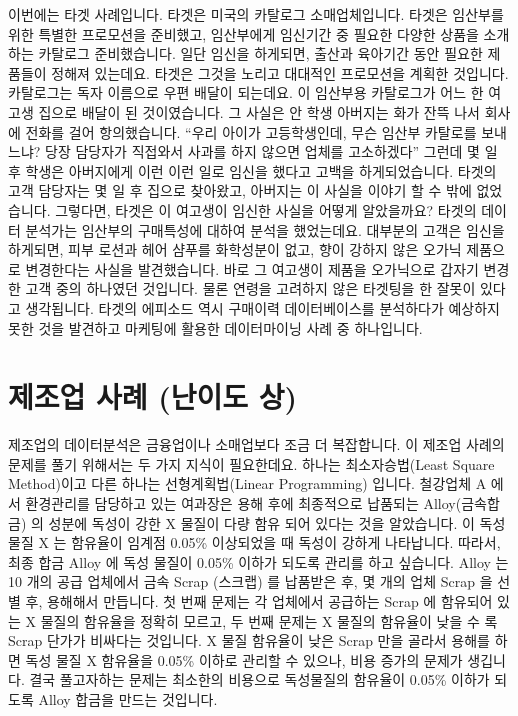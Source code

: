 \documentclass[letterpaper,10pt,english]{jupyterBook}
\begin{document}
\sphinxAtStartPar
이번에는 타겟 사례입니다. 타겟은 미국의 카탈로그 소매업체입니다. 타겟은 임산부를 위한 특별한 프로모션을 준비했고, 임산부에게 임신기간 중 필요한 다양한 상품을 소개하는 카탈로그 준비했습니다. 일단 임신을 하게되면, 출산과 육아기간 동안 필요한 제품들이 정해져 있는데요. 타겟은 그것을 노리고 대대적인 프로모션을 계획한 것입니다. 카탈로그는 독자 이름으로 우편 배달이 되는데요. 이 임산부용 카탈로그가 어느 한 여고생 집으로 배달이 된 것이였습니다. 그 사실은 안 학생 아버지는 화가 잔뜩 나서 회사에 전화를 걸어 항의했습니다. “우리 아이가 고등학생인데, 무슨 임산부 카탈로를 보내느냐? 당장 담당자가 직접와서 사과를 하지 않으면 업체를 고소하겠다”  그런데 몇 일 후 학생은 아버지에게 이런 이런 일로 임신을 했다고 고백을 하게되었습니다. 타겟의 고객 담당자는 몇 일 후 집으로 찾아왔고, 아버지는 이 사실을 이야기 할 수 밖에 없었습니다. 그렇다면, 타겟은 이 여고생이 임신한 사실을 어떻게 알았을까요?  타겟의 데이터 분석가는 임산부의 구매특성에 대하여 분석을 했었는데요. 대부분의 고객은 임신을 하게되면, 피부 로션과 헤어 샴푸를 화학성분이 없고, 향이 강하지 않은 오가닉 제품으로 변경한다는 사실을 발견했습니다. 바로 그 여고생이 제품을 오가닉으로 갑자기 변경한 고객 중의 하나였던 것입니다. 물론 연령을 고려하지 않은 타겟팅을 한 잘못이 있다고 생각됩니다. 타겟의 에피소드 역시 구매이력 데이터베이스를 분석하다가 예상하지 못한 것을 발견하고 마케팅에 활용한 데이터마이닝 사례 중 하나입니다.


\section{제조업 사례 (난이도 상)}
\label{\detokenize{chapter3/3.1.4_Use_Case:id1}}\label{\detokenize{chapter3/3.1.4_Use_Case::doc}}
\sphinxAtStartPar
제조업의 데이터분석은 금융업이나 소매업보다 조금 더 복잡합니다.  이 제조업 사례의 문제를 풀기 위해서는 두 가지 지식이 필요한데요. 하나는 최소자승법(Least Square Method)이고 다른 하나는 선형계획법(Linear Programming) 입니다.  철강업체 A 에서 환경관리를 담당하고 있는 여과장은 용해 후에 최종적으로 납품되는 Alloy(금속합금) 의 성분에 독성이 강한 X 물질이 다량 함유 되어 있다는 것을 알았습니다. 이 독성물질 X 는 함유율이 임계점 0.05\% 이상되었을 때 독성이 강하게 나타납니다. 따라서, 최종 합금 Alloy 에 독성 물질이 0.05\% 이하가 되도록 관리를 하고 싶습니다. Alloy 는 10 개의 공급 업체에서 금속 Scrap (스크랩) 를 납품받은 후, 몇 개의 업체 Scrap 을 선별 후, 용해해서 만듭니다. 첫 번째 문제는 각 업체에서 공급하는 Scrap 에 함유되어 있는 X 물질의 함유율을 정확히 모르고, 두 번째 문제는 X 물질의 함유율이 낮을 수 록 Scrap 단가가 비싸다는 것입니다. X 물질 함유율이 낮은 Scrap 만을 골라서 용해를 하면 독성 물질 X 함유율을 0.05\% 이하로 관리할 수 있으나, 비용 증가의 문제가 생깁니다. 결국 풀고자하는 문제는 최소한의 비용으로 독성물질의 함유율이 0.05\% 이하가 되도록 Alloy 합금을 만드는 것입니다.
\end{document}
